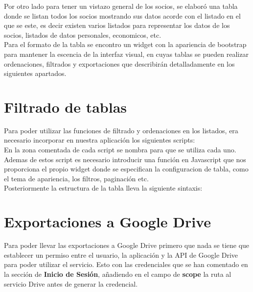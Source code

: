 

Por otro lado para tener un vistazo general de los socios, se elaboró una tabla donde se listan todos los socios mostrando sus datos acorde con el listado en el que se este, es decir existen varios listados para representar los 
datos de los socios, listados de datos personales, economicos, etc.\\

Para el formato de la tabla se encontro un widget con la  apariencia de bootstrap para mantener la escencia de la interfaz visual, en cuyas tablas se pueden
realizar ordenaciones, filtrados y exportaciones que describirán detalladamente en los siguientes apartados.

\section{Filtrado de tablas}
\label{4:sec8}
Para poder utilizar las funciones de filtrado y ordenaciones en los listados, era necesario incorporar en nuestra aplicación los siguientes scripts:\\



En la zona comentada de cada script se nombra para que se utiliza cada uno. Ademas de estos script es necesario introducir una función en Javascript que nos  proporciona el propio widget donde se especifican la configuracion de 
tabla, como el tema de apariencia, los filtros, paginación etc.\\

Posteriormente la estructura de la tabla lleva la siguiente sintaxis:\\



\section{Exportaciones a Google Drive}
\label{4:sec9}

Para poder llevar las exportaciones a Google Drive primero que nada se tiene que establecer un permiso entre el  usuario, la aplicación y la API de Google Drive para poder utilizar el servicio. Esto con las credenciales que se han
comentado en la sección de \textbf{Inicio de Sesión}, añadiendo en el campo de \textbf{scope} la ruta al servicio Drive antes de generar la credencial.\\

